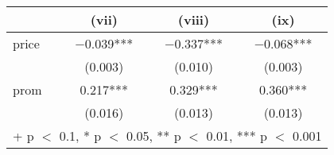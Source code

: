 \begin{table}
\centering
\begin{tabular}[t]{lccc}
\toprule
  & (vii) & (viii) & (ix)\\
\midrule
price & \num{-0.039}*** & \num{-0.337}*** & \num{-0.068}***\\
 & (\num{0.003}) & (\num{0.010}) & (\num{0.003})\\
prom & \num{0.217}*** & \num{0.329}*** & \num{0.360}***\\
 & (\num{0.016}) & (\num{0.013}) & (\num{0.013})\\
\bottomrule
\multicolumn{4}{l}{\rule{0pt}{1em}+ p $<$ 0.1, * p $<$ 0.05, ** p $<$ 0.01, *** p $<$ 0.001}\\
\end{tabular}
\end{table}
